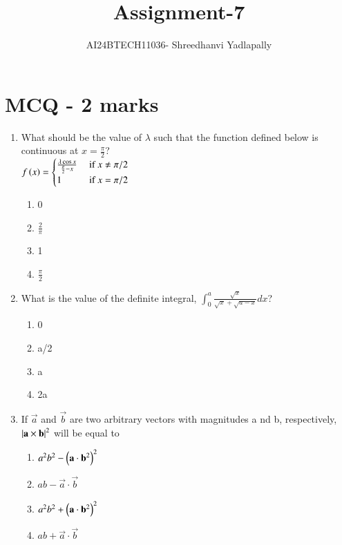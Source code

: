 \documentclass[journal,12pt,onecolumn]{IEEEtran}
\theoremstyle{remark}
\begin{document}

\vspace{3cm}

\title{Assignment-7}
\author{AI24BTECH11036- Shreedhanvi Yadlapally}
\maketitle

\bigskip
\renewcommand{\thefigure}{\theenumi}
\renewcommand{\thetable}{\theenumi}
\section{MCQ - 2 marks}

\begin{enumerate}

\item What should be the value of $\lambda$ such that the function defined below is continuous at $x=\frac{\pi}{2}$?\\
$f\left(x\right)=
\begin{cases}
\frac{\lambda \cos x}{\frac{\pi}{2}-x} & \text{ if } x\neq \pi /2 \\
1 & \text{ if } x=\pi /2 \\
\end{cases}$
	\begin{multicols}{4}
	\begin{enumerate}
		\item 0
		\item $\frac{2}{\pi}$
		\item 1
		\item $\frac{\pi}{2}$
	\end{enumerate}
	\end{multicols}

\item What is the value of the definite integral, $\int_{0}^{a} \frac{\sqrt{x}}{\sqrt{x}+\sqrt{a-x}} dx$?
	\begin{multicols}{4}
	\begin{enumerate}
		\item 0
		\item a/2
		\item a
		\item 2a
	\end{enumerate}
	\end{multicols}

\item If $\vec{a}$ and $\vec{b}$ are two arbitrary vectors with magnitudes a nd b, respectively, $\left\vert\mathbf{a} \times \mathbf{b}\right\vert^2$ will be equal to
	\begin{multicols}{4}
	\begin{enumerate}
		\item $a^{2}b^{2}-\left(\mathbf{a} \cdot \mathbf{b}^2\right)^{2}$
		\item $ab-\vec{a} \cdot \vec{b}$
		\item $a^{2}b^{2}+\left(\mathbf{a} \cdot \mathbf{b}^2\right)^{2}$
		\item $ab+\vec{a} \cdot \vec{b}$
	\end{enumerate}
	\end{multicols}


\end{enumerate}
\end{document}
